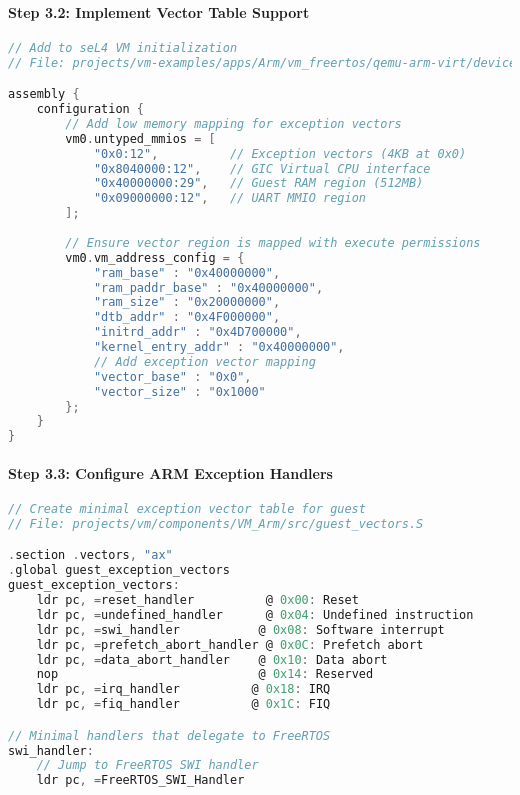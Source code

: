 \documentclass[11pt,a4paper]{article}
\begin{document}
\paragraph{Step 3.2: Implement Vector Table Support}
\begin{lstlisting}[language=c]
// Add to seL4 VM initialization
// File: projects/vm-examples/apps/Arm/vm_freertos/qemu-arm-virt/devices.camkes

assembly {
    configuration {
        // Add low memory mapping for exception vectors
        vm0.untyped_mmios = [
            "0x0:12",          // Exception vectors (4KB at 0x0)
            "0x8040000:12",    // GIC Virtual CPU interface
            "0x40000000:29",   // Guest RAM region (512MB)
            "0x09000000:12",   // UART MMIO region
        ];
        
        // Ensure vector region is mapped with execute permissions
        vm0.vm_address_config = {
            "ram_base" : "0x40000000",
            "ram_paddr_base" : "0x40000000",
            "ram_size" : "0x20000000",
            "dtb_addr" : "0x4F000000",
            "initrd_addr" : "0x4D700000",
            "kernel_entry_addr" : "0x40000000",
            // Add exception vector mapping
            "vector_base" : "0x0",
            "vector_size" : "0x1000"
        };
    }
}
\end{lstlisting}

\paragraph{Step 3.3: Configure ARM Exception Handlers}
\begin{lstlisting}[language=c]
// Create minimal exception vector table for guest
// File: projects/vm/components/VM_Arm/src/guest_vectors.S

.section .vectors, "ax"
.global guest_exception_vectors
guest_exception_vectors:
    ldr pc, =reset_handler          @ 0x00: Reset
    ldr pc, =undefined_handler      @ 0x04: Undefined instruction  
    ldr pc, =swi_handler           @ 0x08: Software interrupt
    ldr pc, =prefetch_abort_handler @ 0x0C: Prefetch abort
    ldr pc, =data_abort_handler    @ 0x10: Data abort
    nop                            @ 0x14: Reserved
    ldr pc, =irq_handler          @ 0x18: IRQ
    ldr pc, =fiq_handler          @ 0x1C: FIQ

// Minimal handlers that delegate to FreeRTOS
swi_handler:
    // Jump to FreeRTOS SWI handler
    ldr pc, =FreeRTOS_SWI_Handler
\end{lstlisting}
\end{document}

